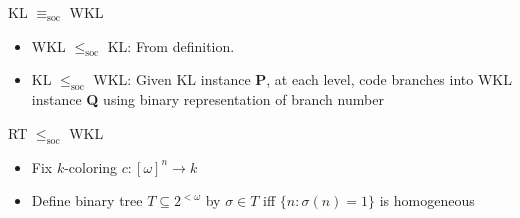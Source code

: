 \begin{frame}{KL $\equiv_{\text{soc}}$ WKL}
  \begin{itemize}
    \item WKL $\leq_{\text{soc}}$ KL: From definition.
    \item KL $\leq_{\text{soc}}$ WKL: Given KL instance \textbf{P}, at
      each level, code branches into WKL instance \textbf{Q} using binary
      representation of branch number
  \end{itemize}
\end{frame}

\begin{frame}{RT $\leq_{\text{soc}}$ WKL}
  \begin{itemize}
    \item Fix $k$-coloring $c:[\omega]^n\rightarrow k$
    \item Define binary tree $T\subseteq 2^{<\omega}$ by $\sigma\in T$
      iff $\{n:\sigma(n)=1\}$ is homogeneous
  \end{itemize}
\end{frame}

